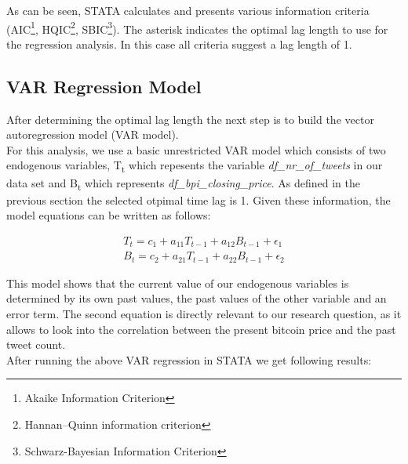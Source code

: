 \documentclass[a4paper,american,12pt]{article}
\begin{document}
\begin{spacing}{1.2}
As can be seen, STATA calculates and presents various information criteria (AIC\footnote{Akaike Information Criterion}, HQIC\footnote{Hannan–Quinn information criterion}, SBIC\footnote{Schwarz-Bayesian Information Criterion}). The asterisk indicates the optimal lag length to use for the regression analysis. In this case all criteria suggest a lag length of 1.
		
\subsection{VAR Regression Model}
After determining the optimal lag length the next step is to build the vector autoregression model (VAR model).\\
For this analysis, we use a basic unrestricted VAR model which consists of two endogenous variables, T\textsubscript t which repesents the variable {\itshape df\_nr\_of\_tweets} in our data set and B\textsubscript t which represents {\itshape df\_bpi\_closing\_price}. As defined in the previous section the selected otpimal time lag is 1. Given these information, the model equations can be written as follows:

\begin{align}
T_t = c_1 + a_{11}T_{t-1} + a_{12}B_{t-1} + \epsilon_1 \\
B_t = c_2 + a_{21}T_{t-1} + a_{22}B_{t-1} + \epsilon_2
\end{align}

This model shows that the current value of our endogenous variables is determined by its own past values, the past values of the other variable and an error term. The second equation is directly relevant to our research question, as it allows to look into the correlation between the present bitcoin price and the past tweet count.\\

After running the above VAR regression in STATA we get following results:
	

\end{spacing}
\end{document}
